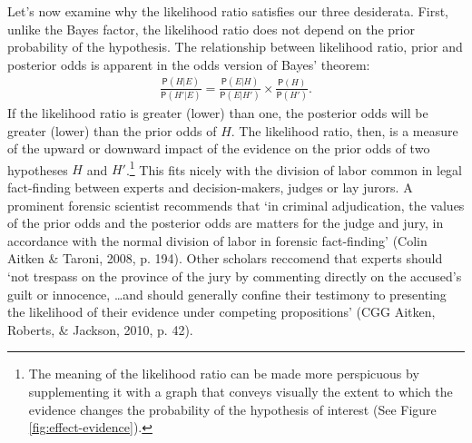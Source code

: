 \documentclass[
  10pt,
  dvipsnames,enabledeprecatedfontcommands]{scrartcl}
\newcommand{\pr}[1]{\mathsf{P}(#1)}
\begin{document}
Let's now examine why the likelihood ratio satisfies our three
desiderata. First, unlike the Bayes factor, the likelihood ratio does
not depend on the prior probability of the hypothesis. The relationship
between likelihood ratio, prior and posterior odds is apparent in the
odds version of Bayes' theorem: \begin{align}\label{eq:BTodds}
\frac{\pr{H \vert E}}{\pr{H' \vert E}}= \frac{\pr{E \vert H}}{\pr{E \vert H'}}\times \frac{\pr{H}}{\pr{H'}}.
\end{align} \noindent If the likelihood ratio is greater (lower) than
one, the posterior odds will be greater (lower) than the prior odds of
\(H\). The likelihood ratio, then, is a measure of the upward or
downward impact of the evidence on the prior odds of two hypotheses
\(H\) and \(H'\).\footnote{The meaning of the likelihood ratio can be
  made more perspicuous by supplementing it with a graph that conveys
  visually the extent to which the evidence changes the probability of
  the hypothesis of interest (See Figure \ref{fig:effect-evidence}).}
This fits nicely with the division of labor common in legal fact-finding
between experts and decision-makers, judges or lay jurors. A prominent
forensic scientist recommends that `in criminal adjudication, the values
of the prior odds and the posterior odds are matters for the judge and
jury, in accordance with the normal division of labor in forensic
fact-finding' (Colin Aitken \& Taroni, 2008, p. 194). Other scholars
reccomend that experts should `not trespass on the province of the jury
by commenting directly on the accused's guilt or innocence, \dots and
should generally confine their testimony to presenting the likelihood of
their evidence under competing propositions' (CGG Aitken, Roberts, \&
Jackson, 2010, p. 42).
\end{document}
